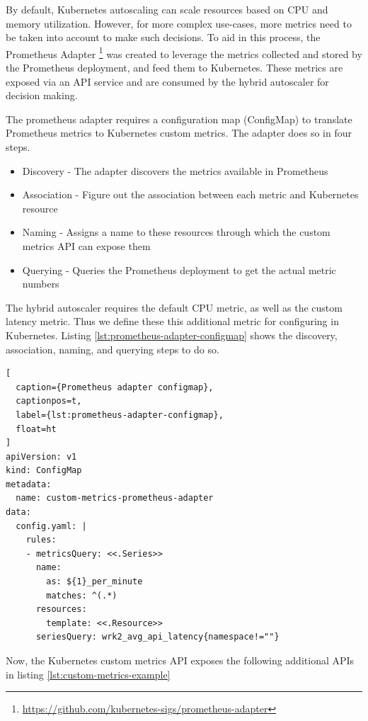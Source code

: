 By default, Kubernetes autoscaling can scale resources based on CPU and memory utilization. However, for more complex use-cases, more metrics need to be taken into account to make such decisions. To aid in this process, the Prometheus Adapter \footnote{\url{https://github.com/kubernetes-sigs/prometheus-adapter}} was created to leverage the metrics collected and stored by the Prometheus deployment, and feed them to Kubernetes. These metrics are exposed via an API service and are consumed by the hybrid autoscaler for decision making.\par

The prometheus adapter requires a configuration map (ConfigMap) to translate Prometheus metrics to Kubernetes custom metrics. The adapter does so in four steps.

\begin{itemize}
    \item Discovery - The adapter discovers the metrics available in Prometheus
    \item Association - Figure out the association between each metric and Kubernetes resource
    \item Naming - Assigns a name to these resources through which the custom metrics API can expose them
    \item Querying - Queries the Prometheus deployment to get the actual metric numbers
\end{itemize}

The hybrid autoscaler requires the default CPU metric, as well as the custom latency metric. Thus we define these this additional metric for configuring in Kubernetes. Listing \ref{lst:prometheus-adapter-configmap} shows the discovery, association, naming, and querying steps to do so.

\begin{lstlisting}[
  caption={Prometheus adapter configmap},
  captionpos=t,
  label={lst:prometheus-adapter-configmap},
  float=ht
]
apiVersion: v1
kind: ConfigMap
metadata:
  name: custom-metrics-prometheus-adapter
data:
  config.yaml: |
    rules:
    - metricsQuery: <<.Series>>
      name:
        as: ${1}_per_minute
        matches: ^(.*)
      resources:
        template: <<.Resource>>
      seriesQuery: wrk2_avg_api_latency{namespace!=""}
\end{lstlisting}

Now, the Kubernetes custom metrics API exposes the following additional APIs in listing \ref{lst:custom-metrics-example}

